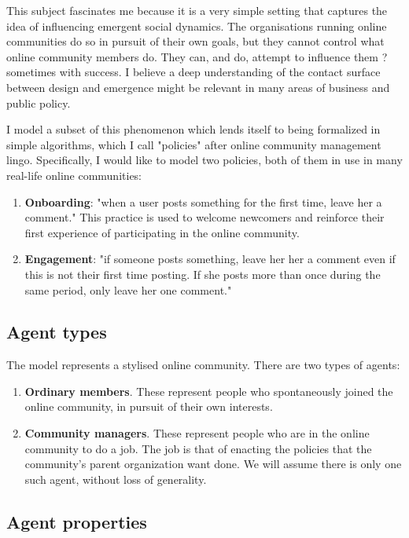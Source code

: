 \documentclass{article}
\begin{document}
This subject fascinates me because it is a very simple setting that captures the idea of influencing emergent social dynamics. The organisations running online communities do so in pursuit of their own goals, but they cannot control what online community members do. They can, and do, attempt to influence them ? sometimes with success. I believe a deep understanding of the contact surface between design and emergence might be relevant in many areas of business and public policy. 

I model a subset of this phenomenon which lends itself to being formalized in simple algorithms, which I call "policies" after online community management lingo.
Specifically, I would like to model two policies, both of them in use in many real-life online communities: 

\begin{enumerate}
\item \textbf{Onboarding}: "when a user posts something for the first time, leave her a comment." This practice is used to welcome newcomers and reinforce their first experience of participating in the online community.
\item \textbf{Engagement}: "if someone posts something, leave her her a comment even if this is not their first time posting. If she posts more than once during the same period, only leave her one comment." 
\end{enumerate}

\subsection{Agent types}
 
The model represents a stylised online community. There are two types of agents:

\begin{enumerate}
\item \textbf{Ordinary members}. These represent people who spontaneously joined the online community, in pursuit of their own interests.
\item \textbf{Community managers}. These represent people who are in the online community to do a job. The job is that of enacting the policies that the community's parent organization want done. We will assume there is only one such agent, without loss of generality.
\end{enumerate}

\subsection{Agent properties}
\end{document}
